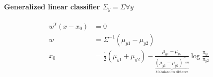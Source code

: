 \documentclass[MachineLearning]{subfiles}
\begin{document}
\paragraph{Generalized linear classifier \(\Sigma_y = \Sigma \forall y\)}
\begin{align}
w^T (x - x_0) &= 0\\
w &= \Sigma^{-1}(\mu_{y1}-\mu_{y2})\\
x_0 &= \frac{1}{2}(\mu_{y1}+\mu_{y2}) - \frac{\mu_{y1}-\mu_{y2}}{\underbrace{(\mu_{y1}-\mu_{y2})^T w}_{\text{Mahalanobis distance}}} \log\frac{\pi_{y1}}{\pi_{y2}}
\end{align} 
\end{document}
